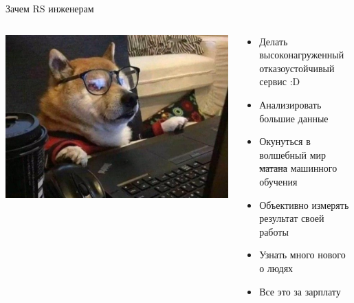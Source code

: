 \documentclass[11pt,aspectratio=169,handout]{beamer}
\begin{document}
\begin{frame}{Зачем RS инженерам}

\begin{columns}
\begin{column}{0.4\textwidth}
   \begin{center}
                \includegraphics[scale=0.25]{images/computerdog.jpeg}
   \end{center}
\end{column}
\begin{column}{0.5\textwidth}
    \begin{small}
    \begin{itemize}
    \item Делать высоконагруженный отказоустойчивый сервис :D
    \item Анализировать большие данные
    \item Окунуться в волшебный мир \sout{матана} машинного обучения
    \item Объективно измерять результат своей работы 
    \item Узнать много нового о людях
    \item Все это за зарплату
    \end{itemize}
    \end{small}
\end{column}
\end{columns}

\end{frame}
\end{document}
